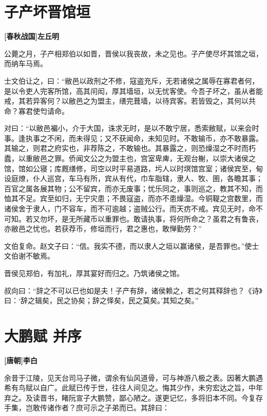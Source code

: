 \documentclass[UTF8,titlepage,oneside]{ctexbook}
\begin{document}
\chapter*{子产坏晋馆垣}
\begin{center}
	\textbf{[春秋战国]左丘明}
\end{center}


公薨之月，子产相郑伯以如晋，晋侯以我丧故，未之见也。子产使尽坏其馆之垣，而纳车马焉。


士文伯让之，曰：“敝邑以政刑之不修，寇盗充斥，无若诸侯之属辱在寡君者何，是以令吏人完客所馆，高其闬闳，厚其墙垣，以无忧客使。今吾子坏之，虽从者能戒，其若异客何？以敝邑之为盟主，缮完葺墙，以待宾客。若皆毁之，其何以共命？寡君使匄请命。


对曰：“以敝邑褊小，介于大国，诛求无时，是以不敢宁居，悉索敝赋，以来会时事。逢执事之不闲，而未得见；又不获闻命，未知见时。不敢输币，亦不敢暴露。其输之，则君之府实也，非荐陈之，不敢输也。其暴露之，则恐燥湿之不时而朽蠹，以重敝邑之罪。侨闻文公之为盟主也，宫室卑庳，无观台榭，以崇大诸侯之馆，馆如公寝；库厩缮修，司空以时平易道路，圬人以时塓馆宫室；诸侯宾至，甸设庭燎，仆人巡宫，车马有所，宾从有代，巾车脂辖，隶人、牧、圉，各瞻其事；百官之属各展其物；公不留宾，而亦无废事；忧乐同之，事则巡之，教其不知，而恤其不足。宾至如归，无宁灾患；不畏寇盗，而亦不患燥湿。今铜鞮之宫数里，而诸侯舍于隶人，门不容车，而不可逾越；盗贼公行。而天疠不戒。宾见无时，命不可知。若又勿坏，是无所藏币以重罪也。敢请执事，将何所命之？虽君之有鲁丧，亦敝邑之忧也。若获荐币，修垣而行，君之惠也，敢惮勤劳？”


文伯复命。赵文子曰：“信。我实不德，而以隶人之垣以赢诸侯，是吾罪也。”使士文伯谢不敏焉。


晋侯见郑伯，有加礼，厚其宴好而归之。乃筑诸侯之馆。


叔向曰：“辞之不可以已也如是夫！子产有辞，诸侯赖之，若之何其释辞也？《诗》曰：‘辞之辑矣，民之协矣；辞之怿矣，民之莫矣。’其知之矣。”



\chapter*{大鹏赋 并序}
\begin{center}
	\textbf{[唐朝]李白}
\end{center}

余昔于江陵，见天台司马子微，谓余有仙风道骨，可与神游八极之表。因著大鹏遇希有鸟赋以自广。此赋已传于世，往往人间见之。悔其少作，未穷宏达之旨，中年弃之。及读晋书，睹阮宣子大鹏赞，鄙心陋之。遂更记忆，多将旧本不同。今复存手集，岂敢传诸作者？庶可示之子弟而已。其辞曰：
\end{document}
